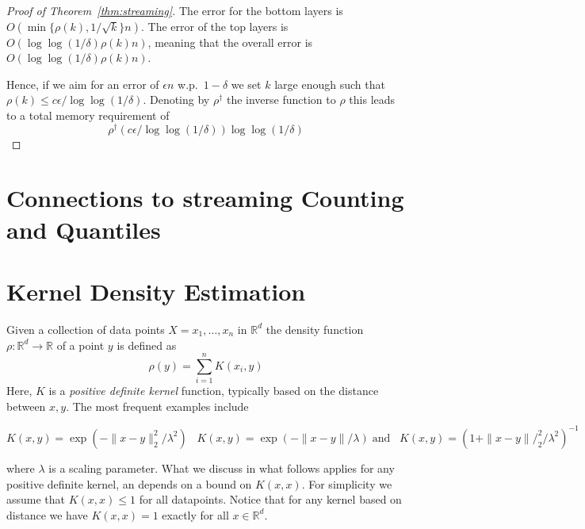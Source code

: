 \documentclass[anon,12pt]{colt2019} %
\newcommand{\R}{\mathbb{R}}
\newcommand{\eps}{\epsilon}
\begin{document}
\begin{proof} [Proof of Theorem~\ref{thm:streaming}]
The error for the bottom layers is $O(\min\{\rho(k), 1/\sqrt{k}\} n)$. The error of the top layers is $O(\log\log(1/\delta) \rho(k) n)$, meaning that the overall error is $O(\log\log(1/\delta) \rho(k) n)$.

Hence, if we aim for an error of $\eps n$ w.p.\ $1-\delta$ we set $k$ large enough such that $\rho(k) \leq c \eps / \log\log(1/\delta)$. Denoting by $\rho^{\dagger}$ the inverse function to $\rho$ this leads to a total memory requirement of 
$$ \rho^{\dagger}(c \eps / \log\log(1/\delta)) \log\log(1/\delta) $$

\end{proof}




\section{Connections to streaming Counting and Quantiles}






\section{Kernel Density Estimation}

Given a collection of data points $X = x_1,\ldots, x_n$ in $\R^d$ the density function $\rho: \R^d \rightarrow \R$ of a point $y$ is defined as 
$$ \rho(y) = \sum_{i=1}^{n} K(x_i,y) $$
Here, $K$ is a \emph{positive definite kernel} function, typically based on the distance between $x,y$. The most frequent examples include

$$ K(x,y) = \exp(- \|x-y\|_2^2/\lambda^2)\;\;\; K(x,y) = \exp(- \|x-y\|/\lambda) \; \mbox{and}\;\;\; K(x,y) = (1+\|x-y\|/_2^2/\lambda^2)^{-1}$$

where $\lambda$ is a scaling parameter. What we discuss in what follows applies for any positive definite kernel, an depends on a bound on $K(x,x)$. For simplicity we assume that $K(x,x) \leq 1$ for all datapoints. Notice that for any kernel based on distance we have $K(x,x)=1$ exactly for all $x \in \R^d$.
\end{document}
